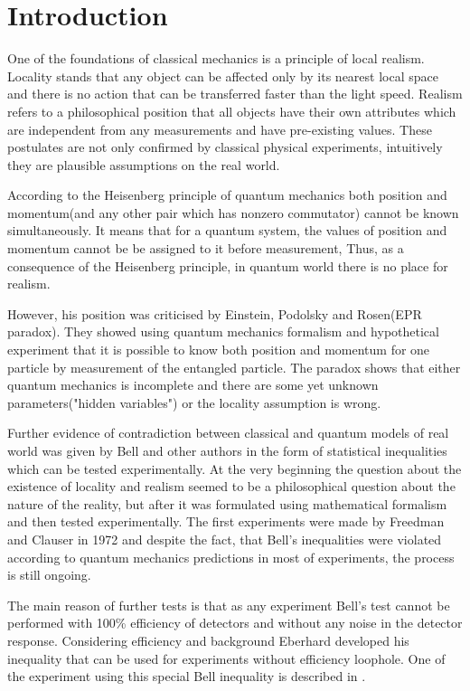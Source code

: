 \documentclass[11pt]{article}
\begin{document}
\section{Introduction}
One of the foundations of classical mechanics is a principle of local realism. Locality stands that any object can be affected only by its nearest local space and there is no action that can be transferred faster than the light speed. Realism refers to a philosophical position that all objects have their own attributes which are independent from any measurements and have pre-existing values. These postulates are not only confirmed by classical physical experiments, intuitively they are plausible assumptions on the real world.

According to the Heisenberg principle of quantum mechanics both position and momentum(and any other pair which has nonzero commutator) cannot be known simultaneously. It means that for a quantum system, the values of position and momentum cannot be be assigned to it before measurement, Thus, as a consequence of the Heisenberg principle, in quantum world there is no place for realism.

However, his position was criticised by Einstein, Podolsky and Rosen(EPR paradox)\cite{EPR}. They showed using quantum mechanics formalism and hypothetical experiment that it is possible to know both position and momentum for one particle by measurement of the entangled particle. The paradox shows that either quantum mechanics is incomplete and there are some yet unknown parameters("hidden variables") or the locality assumption is wrong. 

Further evidence of contradiction between classical and quantum models of real world was given by Bell and other authors in the form of statistical inequalities which can be tested experimentally. At the very beginning the question about the existence of locality and realism seemed to be a philosophical question about the nature of the reality, but after it was formulated using mathematical formalism and then tested experimentally. The first experiments were made by Freedman and Clauser in 1972 and despite the fact, that Bell's inequalities were violated according to quantum mechanics predictions in most of experiments, the process is still ongoing.

The main reason of further tests is that as any experiment Bell's test cannot be performed with 100\% efficiency of detectors and without any noise in the detector response. Considering efficiency and background Eberhard developed his inequality \cite{Eberhard} that can be used for experiments without efficiency loophole. One of the experiment using this special Bell inequality is described in \cite{Zeilinger}.
\end{document}
